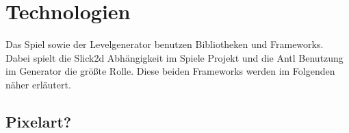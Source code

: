 \section{Technologien}

Das Spiel sowie der Levelgenerator benutzen Bibliotheken und Frameworks. Dabei spielt die Slick2d Abhängigkeit im Spiele Projekt und die Antl Benutzung im Generator die größte Rolle. Diese beiden Frameworks werden im Folgenden näher erläutert.




\subsection{Pixelart?}